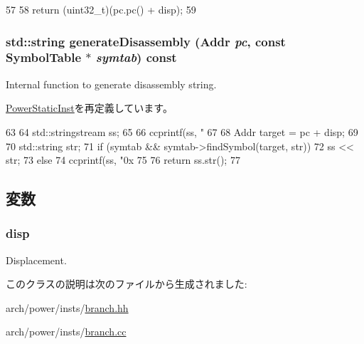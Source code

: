 \begin{DoxyCode}
57 {
58     return (uint32_t)(pc.pc() + disp);
59 }
\end{DoxyCode}
\hypertarget{classPowerISA_1_1BranchPCRel_a95d323a22a5f07e14d6b4c9385a91896}{
\subsubsection[{generateDisassembly}]{\setlength{\rightskip}{0pt plus 5cm}std::string generateDisassembly ({\bf Addr} {\em pc}, \/  const SymbolTable $\ast$ {\em symtab}) const}}
\label{classPowerISA_1_1BranchPCRel_a95d323a22a5f07e14d6b4c9385a91896}
Internal function to generate disassembly string. 

\hyperlink{classPowerISA_1_1PowerStaticInst_a95d323a22a5f07e14d6b4c9385a91896}{PowerStaticInst}を再定義しています。


\begin{DoxyCode}
63 {
64     std::stringstream ss;
65 
66     ccprintf(ss, "%
67 
68     Addr target = pc + disp;
69 
70     std::string str;
71     if (symtab && symtab->findSymbol(target, str))
72         ss << str;
73     else
74         ccprintf(ss, "0x%
75 
76     return ss.str();
77 }
\end{DoxyCode}


\subsection{変数}
\hypertarget{classPowerISA_1_1BranchPCRel_a0c5598bcc641a0989f32ce0b0ea29bb3}{
\subsubsection[{disp}]{ {\bf disp}}}
\label{classPowerISA_1_1BranchPCRel_a0c5598bcc641a0989f32ce0b0ea29bb3}


Displacement. 

このクラスの説明は次のファイルから生成されました:\begin{DoxyCompactItemize}
\item 
arch/power/insts/\hyperlink{power_2insts_2branch_8hh}{branch.hh}\item 
arch/power/insts/\hyperlink{branch_8cc}{branch.cc}\end{DoxyCompactItemize}
